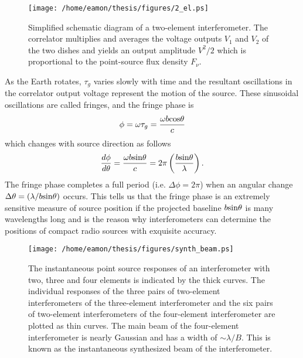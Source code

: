 \begin{figure}[hbt!]
\centering 
          \texttt{[image: /home/eamon/thesis/figures/2\_el.ps]}
\caption[Simplified schematic diagram of a two-element interferometer.]{Simplified schematic diagram of a two-element interferometer. The correlator multiplies and averages the voltage outputs $V_1$ and $V_2$ of the two dishes and yields an output amplitude $V^2/2$ which is proportional to the point-source flux density $F_{\nu}$.}
\label{fig2g}
\end{figure}

As the Earth rotates, $\tau _g$ varies slowly with time and the resultant oscillations in the correlator output voltage represent the motion of the source. These sinusoidal oscillations are called fringes, and the fringe phase is 
\begin{equation}
\phi = \omega \tau _g = \frac{\omega b\rm{cos} \theta}{c}
\end{equation}
which changes with source direction as follows
\begin{equation}
\frac{d\phi}{d\theta}= \frac{\omega b\rm{sin} \theta}{c}=2\pi\left(\frac{b\rm{sin}\theta}{\lambda}\right).
\end{equation}
The fringe phase completes a full period (i.e. $\Delta \phi=2\pi$) when an angular change $\Delta \theta=(\lambda/b\rm{sin}\theta)$ occurs. This tells us that the fringe phase is an extremely sensitive measure of source position if the projected baseline $b\rm{sin}\theta$ is many wavelengths long and is the reason why interferometers can determine the positions of compact radio sources with exquisite accuracy.

\begin{figure}[hbt!]
\centering 
          \texttt{[image: /home/eamon/thesis/figures/synth\_beam.ps]}
\caption[The instantaneous point source responses of an interferometer.]{The instantaneous point source responses of an interferometer with two, three and four elements is indicated by the thick curves. The individual responses of the three pairs of two-element interferometers of the three-element interferometer and the six pairs of two-element interferometers of the four-element interferometer are plotted as thin curves. The main beam of the four-element interferometer is nearly Gaussian and has a width of $\sim \lambda /B$. This is known as the instantaneous synthesized beam of the interferometer.}
\label{fig2h}
\end{figure}

